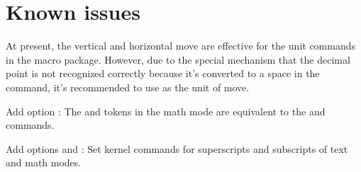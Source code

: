 \documentclass[load-preamble+]{cnltx-doc}
\begin{document}
\section{Known issues}
At present, the vertical and horizontal move are effective for the unit commands in the  macro package. However, due to the special mechanism that the decimal point is not recognized correctly because it's converted to a space in the  command, it's recommended to use  as the unit of move.

\appendix
\begin{changelog}[simple]
  \begin{version}[v = 1.46j,date = 2024/05/19]
  \item Add option : The \code{\^{}} and \code{\_{}} tokens in the math mode are equivalent to the  and  commands.
  \end{version}
  \begin{version}[v = 1.46k,date = 2024/06/21]
  \item Add options  and : Set kernel commands for superscripts and subscripts of text and math modes.
  \end{version}
\end{changelog}
\nocite{*}
\end{document}
